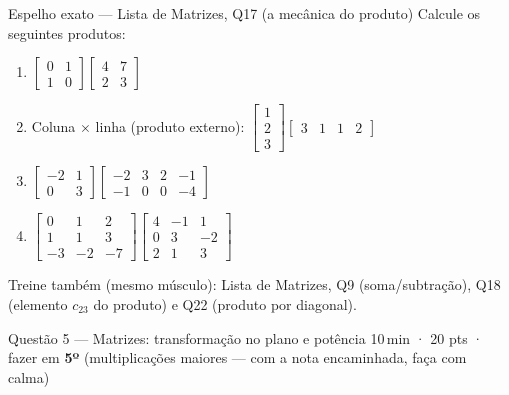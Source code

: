 \documentclass[11pt]{article}
\newcommand{\meta}[1]{{\small\color{inkgray}#1}}
\begin{document}
\begin{espelhobox}{Espelho exato — Lista de Matrizes, Q17 (a mecânica do produto)}
Calcule os seguintes produtos:
\begin{enumerate}[label=\alph*), leftmargin=2em]
  \item $\begin{bmatrix} 0 & 1 \\ 1 & 0 \end{bmatrix} \begin{bmatrix} 4 & 7 \\ 2 & 3 \end{bmatrix}$
  \item Coluna $\times$ linha (produto externo): $\begin{bmatrix} 1 \\ 2 \\ 3 \end{bmatrix} \begin{bmatrix} 3 & 1 & 1 & 2 \end{bmatrix}$
  \item $\begin{bmatrix} -2 & 1 \\ 0 & 3 \end{bmatrix} \begin{bmatrix} -2 & 3 & 2 & -1 \\ -1 & 0 & 0 & -4 \end{bmatrix}$
  \item $\begin{bmatrix} 0 & 1 & 2 \\ 1 & 1 & 3 \\ -3 & -2 & -7 \end{bmatrix} \begin{bmatrix} 4 & -1 & 1 \\ 0 & 3 & -2 \\ 2 & 1 & 3 \end{bmatrix}$
\end{enumerate}
\end{espelhobox}

\meta{Treine também (mesmo músculo): Lista de Matrizes, Q9 (soma/subtração), Q18 (elemento $c_{23}$ do produto) e Q22 (produto por diagonal).}

\begin{questaobox}{Questão 5 — Matrizes: transformação no plano e potência}
\meta{10\,min · 20 pts · fazer em \textbf{5º} (multiplicações maiores — com a nota encaminhada, faça com calma)}
\end{questaobox}
\end{document}
